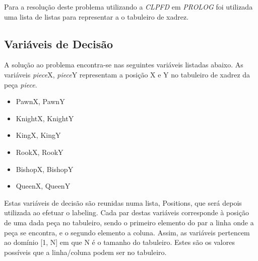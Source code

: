 \documentclass[runningheads]{llncs}
\begin{document}
Para a resolução deste problema utilizando a \emph{CLPFD} em \emph{PROLOG} foi utilizada uma lista de listas para representar a
o tabuleiro de xadrez.

\subsection{Variáveis de Decisão}
    A solução ao problema encontra-se nas seguintes variáveis listadas abaixo. As variáveis \emph{piece}X, \emph{piece}Y 
    representam a posição X e Y no tabuleiro de xadrez da peça \emph{piece}.
    
    \begin{itemize}
        \item PawnX, PawnY
        \item KnightX, KnightY
        \item KingX, KingY
        \item RookX, RookY
        \item BishopX, BishopY
        \item QueenX, QueenY
    \end{itemize}
    
    Estas variáveis de decisão são reunidas numa lista, Positions, que será depois utilizada ao efetuar o labeling.
    Cada par destas variáveis corresponde à posição de uma dada peça no tabuleiro, sendo o primeiro elemento do par a linha onde a peça se encontra, e o segundo elemento a coluna.
    Assim, as variáveis pertencem ao domínio [1, N] em que N é o tamanho do tabuleiro. Estes são os valores possíveis que a linha/coluna podem ser no tabuleiro.
    
\end{document}
